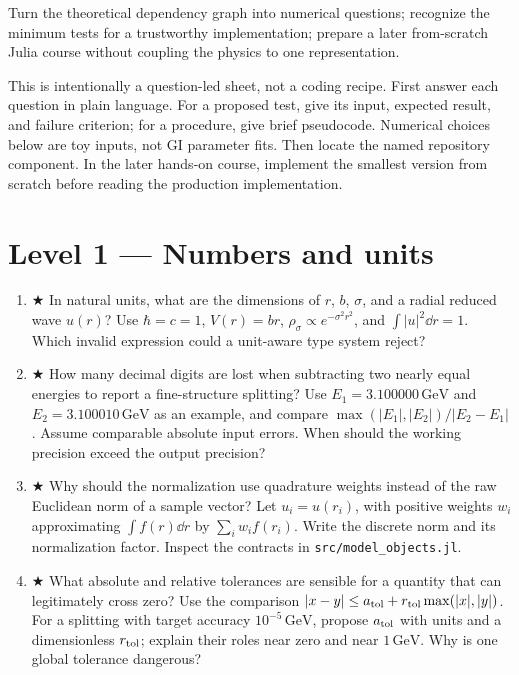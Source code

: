 \documentclass[11pt]{article}
\begin{document}

\begin{goals}
Turn the theoretical dependency graph into numerical questions; recognize the
minimum tests for a trustworthy implementation; prepare a later from-scratch
Julia course without coupling the physics to one representation.
\end{goals}

\begin{checkpoint}
This is intentionally a question-led sheet, not a coding recipe. First answer
each question in plain language. For a proposed test, give its input,
expected result, and failure criterion; for a procedure, give brief pseudocode.
Numerical choices below are toy inputs, not GI parameter fits.
Then locate the named repository component.
In the later hands-on course, implement the smallest version from scratch before
reading the production implementation.
\end{checkpoint}

\section*{Level 1 — Numbers and units}
\begin{enumerate}
\item ★ In natural units, what are the dimensions of $r$, $b$, $\sigma$, and a
radial reduced wave $u(r)$? Use $\hbar=c=1$, $V(r)=br$,
$\rho_\sigma\propto e^{-\sigma^2r^2}$, and $\int|u|^2\dd r=1$.
Which invalid expression could a unit-aware type
system reject?
\item ★ How many decimal digits are lost when subtracting two nearly equal
energies to report a fine-structure splitting? Use $E_1=3.100000\,\mathrm{GeV}$
and $E_2=3.100010\,\mathrm{GeV}$ as an example, and compare
$\max(|E_1|,|E_2|)/|E_2-E_1|$. Assume comparable absolute input errors.
When should the working precision exceed the output precision?
\item ★ Why should the normalization use quadrature weights instead of the raw
Euclidean norm of a sample vector? Let $u_i=u(r_i)$, with positive weights
$w_i$ approximating $\int f(r)\dd r$ by $\sum_iw_if(r_i)$.
Write the discrete norm and its normalization factor. Inspect the contracts in
\texttt{src/model\_objects.jl}.
\item ★ What absolute and relative tolerances are sensible for a quantity that
can legitimately cross zero? Use the comparison
$|x-y|\le a_{\rm tol}+r_{\rm tol}\max(|x|,|y|)$.
For a splitting with target accuracy $10^{-5}\,\mathrm{GeV}$, propose
$a_{\rm tol}$ with units and a dimensionless $r_{\rm tol}$; explain their roles
near zero and near $1\,\mathrm{GeV}$. Why is one global tolerance dangerous?
\end{enumerate}
\end{document}
